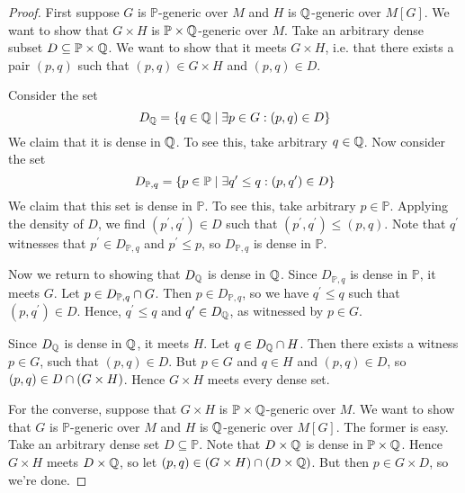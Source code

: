 \documentclass[11pt]{article}
\renewcommand{\P}{\mathbb{P}}
\begin{document}
\begin{proof}
    First suppose $G$ is $\P$-generic over $M$ and $H$ is $\mathbb{Q}$-generic over
    $M[G]$.
    We want to show that $G \times H$ is $\P \times \Q$-generic over $M$.
    Take an arbitrary dense subset $D \subseteq \P \times \Q$.
    We want to show that it meets $G \times H$,
    i.e. that there exists a pair $(p, q)$ such that $(p, q) \in G \times H$
    and $(p, q) \in D$.

    Consider the set
    \begin{equation*}
        D_{\mathbb{Q}} = \left\{ q \in \mathbb{Q} \;\vert\; \exists p \in G : (p, q) \in D \right\}
    \end{equation*}
    We claim that it is dense in $\mathbb{Q}$.
    To see this, take arbitrary $q \in \mathbb{Q}$.
    Now consider the set
    \begin{equation*}
        D_{\P,q} = \setof{
            p \in \P \sth \exists q^\prime \leq q : (p, q^\prime) \in D
        }
    \end{equation*}
    We claim that this set is dense in $\P$.
    To see this, take arbitrary $p \in \P$.
    Applying the density of $D$,
    we find $(p^\prime, q^\prime) \in D$
    such that $(p^\prime, q^\prime) \leq (p, q)$.
    Note that $q^\prime$ witnesses that $p^\prime \in D_{\P,q}$ and
    $p^\prime \leq p$, so $D_{\P,q}$ is dense in $\P$.

    Now we return to showing that $D_{\mathbb{Q}}$ is dense in $\mathbb{Q}$.
    Since $D_{\P,q}$ is dense in $\P$, it meets $G$.
    Let $p \in D_{\P,q} \intersn G$.
    Then $p \in D_{\P,q}$, so we have $q^\prime \leq q$
    such that $(p, q^\prime) \in D$.
    Hence, $q^\prime \leq q$ and $q^\prime \in D_{\mathbb{Q}}$,
    as witnessed by $p \in G$.

    Since $D_{\mathbb{Q}}$ is dense in $\mathbb{Q}$, it meets $H$.
    Let $q \in D_{\mathbb{Q}} \cap H$.
    Then there exists a witness $p \in G$, such that $(p, q) \in D$.
    But $p \in G$ and $q \in H$ and $(p, q) \in D$,
    so $(p, q) \in D \cap (G \times H)$.
    Hence $G \times H$ meets every dense set.

    For the converse, suppose that $G \times H$ is $\P \times \Q$-generic over
    $M$.
    We want to show that $G$ is $\P$-generic over $M$ and $H$ is $\mathbb{Q}$-generic
    over $M[G]$.
    The former is easy.
    Take an arbitrary dense set $D \subseteq \P$.
    Note that $D \times \mathbb{Q}$ is dense in $\P \times \Q$.
    Hence $G \times H$ meets $D \times \mathbb{Q}$,
    so let $(p, q) \in (G \times H) \cap (D \times \mathbb{Q})$.
    But then $p \in G \times D$, so we're done.


\end{proof}
\end{document}
